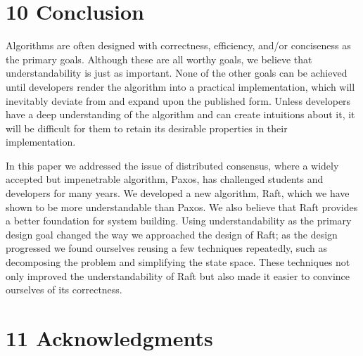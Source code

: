 \documentclass[
]{article}
\begin{document}
\section{10 Conclusion}\label{conclusion}

Algorithms are often designed with correctness, efficiency, and/or
conciseness as the primary goals. Although these are all worthy goals,
we believe that understandability is just as important. None of the
other goals can be achieved until developers render the algorithm into a
practical implementation, which will inevitably deviate from and expand
upon the published form. Unless developers have a deep understanding of
the algorithm and can create intuitions about it, it will be difficult
for them to retain its desirable properties in their implementation.

In this paper we addressed the issue of distributed consensus, where a
widely accepted but impenetrable algorithm, Paxos, has challenged
students and developers for many years. We developed a new algorithm,
Raft, which we have shown to be more understandable than Paxos. We also
believe that Raft provides a better foundation for system building.
Using understandability as the primary design goal changed the way we
approached the design of Raft; as the design progressed we found
ourselves reusing a few techniques repeatedly, such as decomposing the
problem and simplifying the state space. These techniques not only
improved the understandability of Raft but also made it easier to
convince ourselves of its correctness.

\section{11 Acknowledgments}\label{acknowledgments}
\end{document}
